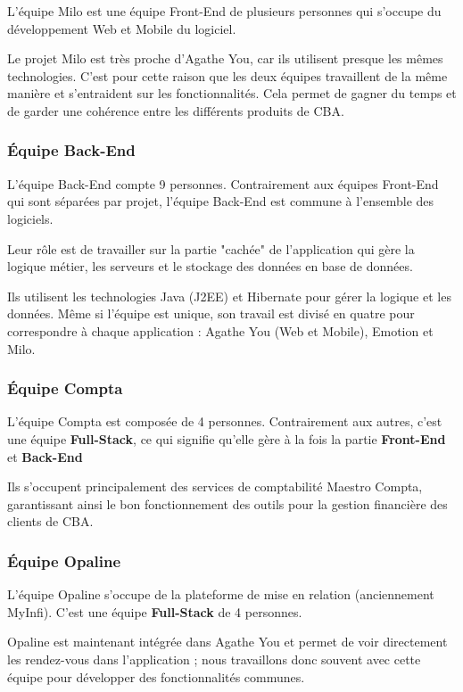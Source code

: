 \documentclass{article}
\begin{document}
L'équipe Milo est une équipe Front-End de plusieurs personnes qui s'occupe du développement Web et Mobile du logiciel.

Le projet Milo est très proche d'Agathe You, car ils utilisent presque les mêmes technologies. C'est pour cette raison que les deux équipes travaillent de la même manière et s'entraident sur les fonctionnalités. Cela permet de gagner du temps et de garder une cohérence entre les différents produits de CBA.

\subsubsection{Équipe Back-End}

L'équipe Back-End compte 9 personnes. Contrairement aux équipes Front-End qui sont séparées par projet, l'équipe Back-End est commune à l'ensemble des logiciels.

Leur rôle est de travailler sur la partie "cachée" de l'application qui gère la logique métier, les serveurs et le stockage des données en base de données.

Ils utilisent les technologies Java (J2EE) et Hibernate pour gérer la logique et les données. Même si l'équipe est unique, son travail est divisé en quatre pour correspondre à chaque application : Agathe You (Web et Mobile), Emotion et Milo.

\subsubsection{Équipe Compta}

L'équipe Compta est composée de 4 personnes. Contrairement aux autres, c'est une équipe \textbf{Full-Stack}, ce qui signifie qu'elle gère à la fois la partie \textbf{Front-End} et \textbf{Back-End}

Ils s'occupent principalement des services de comptabilité Maestro Compta, garantissant ainsi le bon fonctionnement des outils pour la gestion financière des clients de CBA.

\subsubsection{Équipe Opaline}

L'équipe Opaline s'occupe de la plateforme de mise en relation (anciennement MyInfi). C'est une équipe \textbf{Full-Stack} de 4 personnes.

Opaline est maintenant intégrée dans Agathe You et permet de voir directement les rendez-vous dans l'application ; nous travaillons donc souvent avec cette équipe pour développer des fonctionnalités communes.
\end{document}
